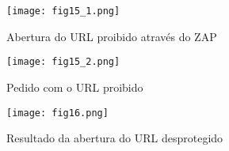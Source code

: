 \begin{figure}[H]

  \centering

  \texttt{[image: fig15\_1.png]}

  \caption{Abertura do URL proibido através do ZAP}

\end{figure}
\begin{figure}[H]

  \centering

  \texttt{[image: fig15\_2.png]}

  \caption{Pedido com o URL proibido}

\end{figure}
\begin{figure}[H]

  \centering

  \texttt{[image: fig16.png]}

  \caption{Resultado da abertura do URL desprotegido}

\end{figure}

